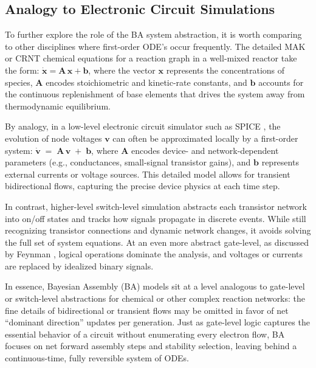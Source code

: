 \documentclass[entropy,article,submit,pdftex,moreauthors]{Definitions/mdpi}
\begin{document}
\subsection{Analogy to Electronic Circuit Simulations}
\label{subsec:spice-analogy}

To further explore the role of the BA system abstraction, it is worth comparing to other disciplines where first-order ODE's occur frequently. The detailed MAK or CRNT chemical equations for a reaction graph in a well-mixed reactor take the form:
${\dot{\mathbf{x}}} = \mathbf{A}\,\mathbf{x} + \mathbf{b}$, where the vector \(\mathbf{x}\) represents the concentrations of species, 
\(\mathbf{A}\) encodes stoichiometric and kinetic-rate constants, and 
\(\mathbf{b}\) accounts for the continuous replenishment of base elements 
that drives the system away from thermodynamic equilibrium.

By analogy, in a low-level electronic circuit simulator such as SPICE \cite{SpiceRef}, the evolution of node voltages $\mathbf{v}$ can often be approximated locally by a first-order system:
$\dot{\mathbf{v}} \;=\; \mathbf{A}\,\mathbf{v} \;+\; \mathbf{b}$,
where $\mathbf{A}$ encodes device- and network-dependent parameters (e.g., conductances, small-signal transistor gains), and $\mathbf{b}$ represents external currents or voltage sources. This detailed model allows for transient bidirectional flows, capturing the precise device physics at each time step.

In contrast, higher-level switch-level simulation \cite{AdlerCAD} abstracts each transistor network into on/off states and tracks how signals propagate in discrete events. While still recognizing transistor connections and dynamic network changes, it avoids solving the full set of system equations. At an even more abstract gate-level, as discussed by Feynman \cite{FeynmanComp}, logical operations dominate the analysis, and voltages or currents are replaced by idealized binary signals.

In essence, Bayesian Assembly (BA) models sit at a level analogous to gate-level or switch-level abstractions for chemical or other complex reaction networks: the fine details of bidirectional or transient flows may be omitted in favor of net “dominant direction” updates per generation. Just as gate-level logic captures the essential behavior of a circuit without enumerating every electron flow, BA focuses on net forward assembly steps and stability selection, leaving behind a continuous-time, fully reversible system of ODEs. 
\end{document}
